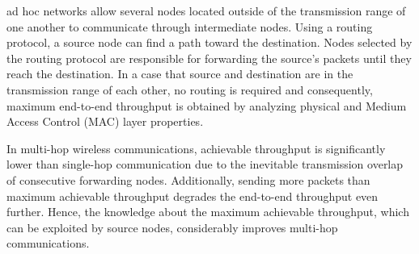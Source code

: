 \documentclass[12pt, draftclsnofoot, onecolumn]{IEEEtran}
\begin{document}
\maketitle


\IEEEdisplaynontitleabstractindextext

\IEEEpeerreviewmaketitle









 ad hoc networks allow several nodes located outside 
of the transmission range of one another to communicate through 
intermediate nodes. Using a routing protocol, a source node can 
find a path toward the destination. Nodes selected by the routing 
protocol are responsible for forwarding the source's packets 
until they reach the destination. In a case that source and 
destination are in the transmission range of each other, no 
routing is required and consequently, maximum end-to-end 
throughput is obtained by analyzing physical and Medium 
Access Control (MAC) layer properties. 


In multi-hop wireless communications, achievable throughput is 
significantly lower than single-hop communication due to the 
inevitable transmission overlap of consecutive forwarding nodes. 
Additionally, sending more packets than maximum achievable 
throughput degrades the end-to-end throughput even further. 
Hence, the knowledge about the maximum achievable throughput, 
which can be exploited by source nodes, considerably improves multi-hop 
communications.
\end{document}
